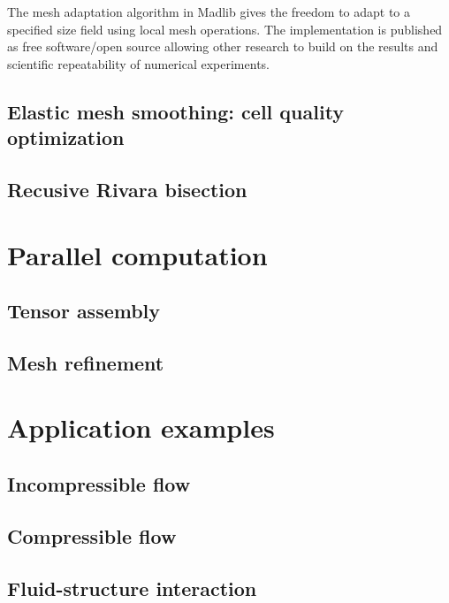 The mesh adaptation algorithm in Madlib gives the freedom to adapt to
a specified size field using local mesh operations. The implementation
is published as free software/open source allowing other research to
build on the results and scientific repeatability of numerical
experiments.

\subsection{Elastic mesh smoothing: cell quality optimization}

\subsection{Recusive Rivara bisection}

\section{Parallel computation}

\subsection{Tensor assembly}

\subsection{Mesh refinement}

\section{Application examples}

\subsection{Incompressible flow}

\subsection{Compressible flow}

\subsection{Fluid-structure interaction}


